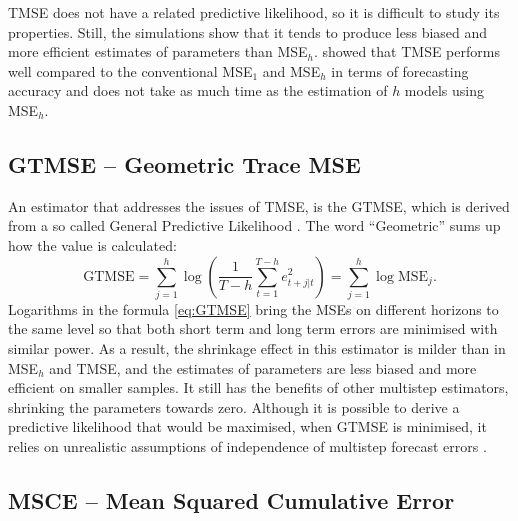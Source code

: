 \documentclass[
]{book}
\theoremstyle{definition}
\theoremstyle{definition}
\theoremstyle{definition}
\theoremstyle{definition}
\theoremstyle{remark}
\begin{document}
TMSE does not have a related predictive likelihood, so it is difficult to study its properties. Still, the simulations show that it tends to produce less biased and more efficient estimates of parameters than MSE\(_h\). \citet{Kourentzes2019} showed that TMSE performs well compared to the conventional MSE\(_1\) and MSE\(_h\) in terms of forecasting accuracy and does not take as much time as the estimation of \(h\) models using MSE\(_h\).

\hypertarget{multistepLossesGTMSE}{%
\subsection{GTMSE -- Geometric Trace MSE}\label{multistepLossesGTMSE}}

An estimator that addresses the issues of TMSE, is the GTMSE, which is derived from a so called General Predictive Likelihood \citep[GPL by][]{Clements1998, Svetunkov2020Multistep}. The word ``Geometric'' sums up how the value is calculated:
\begin{equation}
    \mathrm{GTMSE} =  \sum_{j=1}^h \log \left(\frac{1}{T-h} \sum_{t=1}^{T-h} e_{t+j|t}^2 \right) = \sum_{j=1}^h \log \mathrm{MSE}_j.
  \label{eq:GTMSE}
\end{equation}
Logarithms in the formula \eqref{eq:GTMSE} bring the MSEs on different horizons to the same level so that both short term and long term errors are minimised with similar power. As a result, the shrinkage effect in this estimator is milder than in MSE\(_h\) and TMSE, and the estimates of parameters are less biased and more efficient on smaller samples. It still has the benefits of other multistep estimators, shrinking the parameters towards zero. Although it is possible to derive a predictive likelihood that would be maximised, when GTMSE is minimised, it relies on unrealistic assumptions of independence of multistep forecast errors \citep[they are always correlated as long as smoothing parameters are not zero][]{Svetunkov2020Multistep}.

\hypertarget{msce-mean-squared-cumulative-error}{%
\subsection{MSCE -- Mean Squared Cumulative Error}\label{msce-mean-squared-cumulative-error}}
\end{document}
